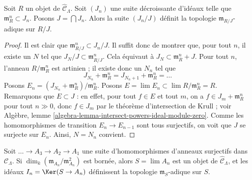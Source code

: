 \begin{lemma}
\label{lemma-m-adic-topology}
Soit $R$ un objet de $\widehat{\mathcal{C}}_\Lambda$. Soit $(J_n)$ une suite
décroissante d'idéaux telle que $\mathfrak m_R^n \subset J_n$.
Posons $J = \bigcap J_n$. Alors la suite $(J_n/J)$ définit la topologie
$\mathfrak m_{R/J}$-adique sur $R/J$.
\end{lemma}

\begin{proof}
Il est clair que $\mathfrak m_{R/J}^n \subset J_n/J$. Il suffit donc de
montrer que, pour tout $n$, il existe un $N$ tel que
$J_N/J \subset \mathfrak m_{R/J}^n$. Cela équivaut à
$J_N \subset \mathfrak m_R^n + J$. Pour tout $n$, l'anneau
$R/\mathfrak m_R^n$ est artinien ; il existe donc un $N_n$ tel que
$$
J_{N_n} + \mathfrak m_R^n = J_{N_n + 1} + \mathfrak m_R^n = \ldots
$$
Posons $E_n = (J_{N_n} + \mathfrak m_R^n)/\mathfrak m_R^n$.
Posons $E = \lim E_n \subset \lim R/\mathfrak m_R^n = R$.
Remarquons que $E \subset J$ : en effet, pour tout $f \in E$ et tout $m$, on
a $f \in J_m + \mathfrak m_R^n$ pour tout $n \gg 0$, donc $f \in J_m$ par le
théorème d'intersection de Krull ; voir Algèbre, lemme
\ref{algebra-lemma-intersect-powers-ideal-module-zero}. Comme les
homomorphismes de transition $E_n \to E_{n - 1}$ sont tous surjectifs, on voit
que $J$ se surjecte sur $E_n$. Ainsi, $N = N_n$ convient.
\end{proof}

\begin{lemma}
\label{lemma-limit-artinian}
Soit $\ldots \to A_3 \to A_2 \to A_1$ une suite d'homomorphismes d'anneaux
surjectifs dans $\mathcal{C}_\Lambda$. Si
$\dim_k (\mathfrak m_{A_n}/\mathfrak m_{A_n}^2)$ est bornée, alors
$S = \lim A_n$ est un objet de $\widehat{\mathcal{C}}_\Lambda$, et les idéaux
$I_n = \Ker(S \to A_n)$ définissent la topologie $\mathfrak m_S$-adique sur
$S$.
\end{lemma}

